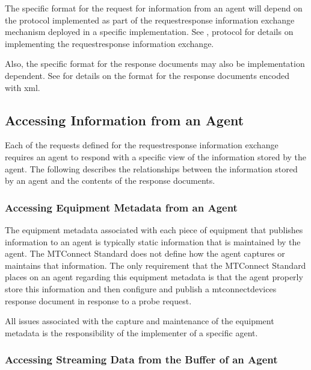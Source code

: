 \documentclass{mtconnect}	%
\begin{document}
The specific format for the \gls{request} for information from an \gls{agent} will depend on the \gls{protocol} implemented as part of the \gls{requestresponse} information exchange mechanism deployed in a specific implementation.  See , \gls{protocol} for details on implementing the \gls{requestresponse} information exchange.

Also, the specific format for the \glspl{response document} may also be implementation dependent.   See  for details on the format for the \glspl{response document} encoded with \gls{xml}.

\subsection{Accessing Information from an Agent}

Each of the \glspl{request} defined for the \gls{requestresponse} information exchange requires an \gls{agent} to respond with a specific view of the information stored by the \gls{agent}.  The following describes the relationships between the information stored by an \gls{agent} and the contents of the \glspl{response document}.

\subsubsection{Accessing Equipment Metadata from an Agent}

The \gls{equipment metadata} associated with each piece of equipment that publishes information to an \gls{agent} is typically static information that is maintained by the \gls{agent}.  The MTConnect Standard does not define how the \gls{agent} captures or maintains that information.  The only requirement that the MTConnect Standard places on an \gls{agent} regarding this \gls{equipment metadata} is that the \gls{agent} properly store this information and then configure and publish a \gls{mtconnectdevices response document} in response to a \gls{probe request}.

All issues associated with the capture and maintenance of the \gls{equipment metadata} is the responsibility of the implementer of a specific \gls{agent}.

\subsubsection{Accessing Streaming Data from the Buffer of an Agent}
\end{document}
